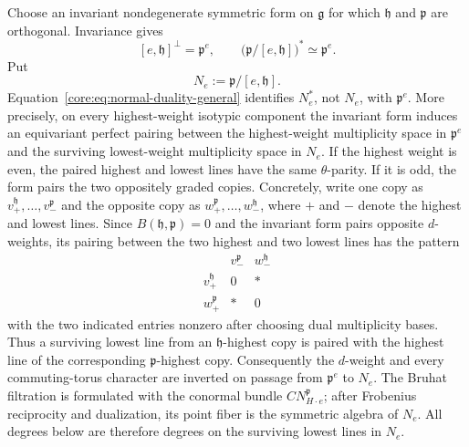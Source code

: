 \documentclass[10pt,a4paper]{amsart}
\numberwithin{equation}{section}
\newcommand{\fg}{\mathfrak g}
\newcommand{\fh}{\mathfrak h}
\newcommand{\fp}{\mathfrak p}
\begin{document}
Choose an invariant nondegenerate symmetric form on $\fg$ for which $\fh$ and
$\fp$ are orthogonal.  Invariance gives
\begin{equation}\label{core:eq:normal-duality-general}
 [e,\fh]^\perp=\fp^e,
 \qquad
 \bigl(\fp/[e,\fh]\bigr)^*\simeq\fp^e.
\end{equation}
Put
\[
 N_e:=\fp/[e,\fh].
\]
Equation~\eqref{core:eq:normal-duality-general} identifies $N_e^*$, not
$N_e$, with $\fp^e$.  More precisely, on every highest-weight isotypic component the invariant
form induces an equivariant perfect pairing between the highest-weight
multiplicity space in $\fp^e$ and the surviving lowest-weight multiplicity
space in $N_e$.  If the highest weight is even, the paired highest and lowest
lines have the same $\theta$-parity.  If it is odd, the form pairs the two
oppositely graded copies.  Concretely, write one copy as
$v_+^{\fh},\ldots,v_-^{\fp}$ and the opposite copy as
$w_+^{\fp},\ldots,w_-^{\fh}$, where $+$ and $-$ denote the highest and
lowest lines.  Since $B(\fh,\fp)=0$ and the invariant form pairs opposite
$d$-weights, its pairing between the two highest and two lowest lines has
the pattern
\[
\begin{array}{c|cc}
 & v_-^{\fp} & w_-^{\fh}\\ \hline
 v_+^{\fh} & 0 & *\\
 w_+^{\fp} & * & 0
\end{array}
\]
with the two indicated entries nonzero after choosing dual multiplicity
bases.  Thus a surviving lowest line from an $\fh$-highest copy is paired
with the highest line of the corresponding $\fp$-highest copy.
Consequently the $d$-weight and every commuting-torus
character are inverted
on passage from $\fp^e$ to $N_e$.  The Bruhat filtration is formulated with the conormal
bundle $CN_{H\cdot e}^{\fp}$; after Frobenius reciprocity and dualization,
its point fiber is the symmetric algebra of $N_e$.  All degrees below are
therefore degrees on the surviving lowest lines in $N_e$.
\end{document}
